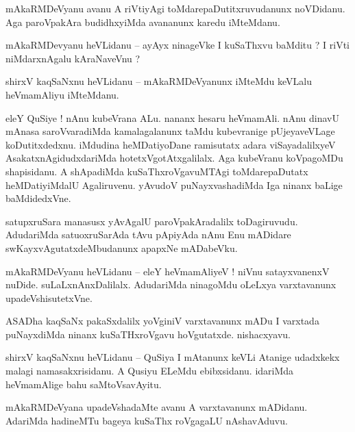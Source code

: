 \documentclass{article}
\begin{document}
\begin{mn}%
mAkaRMDeVyanu avanu A riVtiyAgi toMdarepaDutitxruvudanunx noVDidanu. Aga paroVpakAra budidhxyiMda 
avananunx karedu iMteMdanu.
\end{mn}

\begin{mn}%
mAkaRMDevyanu heVLidanu -- ayAyx ninageVke I kuSaThxvu baMditu ? I riVti niMdarxnAgalu kAraNaveVnu ?
\end{mn}

\begin{mn}%
shirxV kaqSaNxnu heVLidanu -- mAkaRMDeVyanunx iMteMdu keVLalu heVmamAliyu iMteMdanu. 
\end{mn}

\begin{mn}%
eleY QuSiye ! nAnu kubeVrana ALu. nananx hesaru heVmamAli. nAnu dinavU mAnasa saroVvaradiMda 
kamalagalanunx taMdu kubevranige pUjeyaveVLage koDutitxdedxnu. iMdudina heMDatiyoDane ramisutatx 
adara viSayadalilxyeV AsakatxnAgidudxdariMda hotetxVgotAtxgalilalx. Aga kubeVranu koVpagoMDu 
shapisidanu. A shApadiMda kuSaThxroVgavuMTAgi toMdarepaDutatx heMDatiyiMdalU Agaliruvenu. yAvudoV 
puNayxvashadiMda Iga ninanx baLige baMdidedxVne.
\end{mn}

\begin{mn}%
satupxruSara manasusx yAvAgalU paroVpakAradalilx toDagiruvudu. AdudariMda satuoxruSarAda tAvu 
pApiyAda nAnu Enu mADidare swKayxvAgutatxdeMbudanunx apapxNe mADabeVku.
\end{mn}

\begin{mn}%
mAkaRMDeVyanu heVLidanu -- eleY heVmamAliyeV ! niVnu satayxvanenxV nuDide. suLaLxnAnxDalilalx. 
AdudariMda ninagoMdu oLeLxya varxtavanunx upadeVshisutetxVne.
\end{mn}

\begin{mn}%
ASADha kaqSaNx pakaSxdalilx yoVginiV varxtavanunx mADu I varxtada puNayxdiMda ninanx kuSaTHxroVgavu 
hoVgutatxde. nishacxyavu.
\end{mn}

\begin{mn}%
shirxV kaqSaNxnu heVLidanu -- QuSiya I mAtanunx keVLi Atanige udadxkekx malagi namasakxrisidanu. A 
Qusiyu ELeMdu ebibxsidanu. idariMda heVmamAlige bahu saMtoVsavAyitu.
\end{mn}

\begin{mn}%
mAkaRMDeVyana upadeVshadaMte avanu A varxtavanunx mADidanu. AdariMda hadineMTu bageya kuSaThx 
roVgagaLU nAshavAduvu.
\end{mn}
\end{document}
